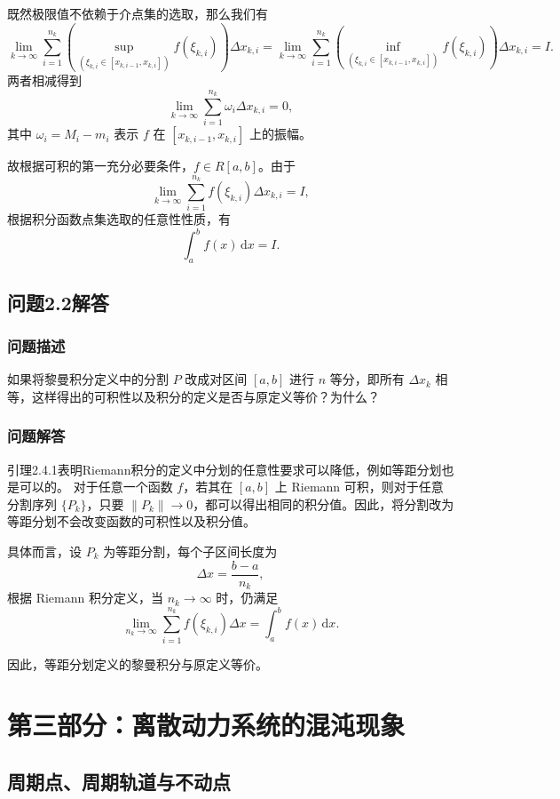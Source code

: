 \documentclass[12pt]{ctexart}
\begin{document}
既然极限值不依赖于介点集的选取，那么我们有
\[
\lim_{k \to \infty} \sum_{i=1}^{n_k} \left( \sup_{(\xi_{k, i} \in [x_{k, i-1}, x_{k, i}])} f(\xi_{k, i}) \right) \Delta x_{k, i}
= \lim_{k \to \infty} \sum_{i=1}^{n_k} \left( \inf_{(\xi_{k, i} \in [x_{k, i-1}, x_{k, i}])} f(\xi_{k, i}) \right) \Delta x_{k, i} = I.
\]
两者相减得到
\[
\lim_{k \to \infty} \sum_{i=1}^{n_k} \omega_i \Delta x_{k, i} = 0,
\]
其中 $\omega_i = M_i - m_i$ 表示 $f$ 在 $[x_{k, i-1}, x_{k, i}]$ 上的振幅。

故根据可积的第一充分必要条件，$f \in R[a, b]$。由于
\[
\lim_{k \to \infty} \sum_{i=1}^{n_k} f(\xi_{k, i}) \Delta x_{k, i} = I,
\]
根据积分函数点集选取的任意性性质，有
\[
\int_a^b f(x) \, \mathrm{d}x = I.
\]

\subsection{问题2.2解答}

\subsubsection*{问题描述}
如果将黎曼积分定义中的分割 $P$ 改成对区间 $[a, b]$ 进行 $n$ 等分，即所有 $\Delta x_k$ 相等，这样得出的可积性以及积分的定义是否与原定义等价？为什么？

\subsubsection*{问题解答}
引理2.4.1表明Riemann积分的定义中分划的任意性要求可以降低，例如等距分划也是可以的。\cite{key1}
对于任意一个函数 $f$，若其在 $[a, b]$ 上 Riemann 可积，则对于任意分割序列 $\{P_k\}$，只要 $\|P_k\| \to 0$，都可以得出相同的积分值。因此，将分割改为等距分划不会改变函数的可积性以及积分值。

具体而言，设 $P_k$ 为等距分割，每个子区间长度为
\[
\Delta x = \frac{b-a}{n_k},
\]
根据 Riemann 积分定义，当 $n_k \to \infty$ 时，仍满足
\[
\lim_{n_k \to \infty} \sum_{i=1}^{n_k} f(\xi_{k, i}) \Delta x = \int_a^b f(x) \, \mathrm{d}x.
\]

因此，等距分划定义的黎曼积分与原定义等价。


\clearpage
\section{第三部分：离散动力系统的混沌现象}

\subsection{周期点、周期轨道与不动点}
\end{document}

